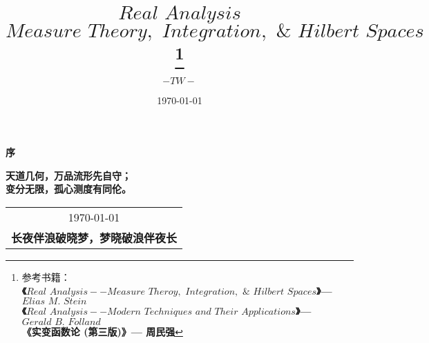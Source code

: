 \title{{\Huge{\textbf{$Real \,\, Analysis$}}}\\
		\Large{\textbf{$Measure \,\, Theory , \,\, Integration , \,\, \& \,\, Hilbert \,\, Spaces$}}\footnote{参考书籍：\\
			\hspace*{4em} \textbf{《$Real \,\, Analysis -- Measure \,\, Theroy, \,\, Integration, \,\, \& \,\, Hilbert \,\, Spaces$》--- $Elias \,\, M. \,\, Stein$} \\
			\hspace*{4em} \textbf{《$Real \,\, Analysis -- Modern \,\, Techniques \,\, and \,\, Their \,\, Applications$》--- $Gerald \,\, B. \,\, Folland$} \\
			\hspace*{4em} \textbf{《实变函数论 (第三版)》--- 周民强}}}
\author{$-TW-$}
\date{\today}
\maketitle                   %

\thispagestyle{empty}        %
\begin{center}
	\Huge\textbf{序}
\end{center}


\vspace*{3em}
\begin{center}
	\large{\textbf{天道几何，万品流形先自守；}}\\
	
	\large{\textbf{变分无限，孤心测度有同伦。}}
\end{center}

\vspace*{3em}
\begin{flushright}
	\begin{tabular}{c}
		\today \\ \small{\textbf{长夜伴浪破晓梦，梦晓破浪伴夜长}}
	\end{tabular}
\end{flushright}


\newpage                      %
\pagestyle{plain}             %
\setcounter{page}{1}          %
\tableofcontents              %

\newpage                      %
\pagestyle{plain}
\setcounter{page}{1}          %
\setcounter{chapter}{0}    %